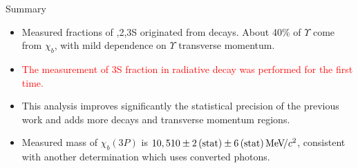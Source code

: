 \begin{frame}{Summary}

\begin{itemize}
\item Measured fractions of ,2,3S originated from \chib decays.
About 40\% of $\Upsilon$ come from $\chi_b$, with mild dependence on $\Upsilon$ transverse momentum.
\item \textcolor{red}{The measurement of \Y3S fraction in radiative \chibThreeP
decay was performed for the first time.}
\item This analysis improves significantly the statistical precision of the previous work and 
adds more decays and transverse momentum regions.
\item Measured mass of $\chi_b(3P)$ is $10{,510}\pm2\mathrm{\,(stat)}\pm6\mathrm{\,(stat)}{\mathrm{\,Me\kern -0.1em V\!/}c^2}$, consistent with another determination which uses converted photons.
\end{itemize}


\end{frame}
